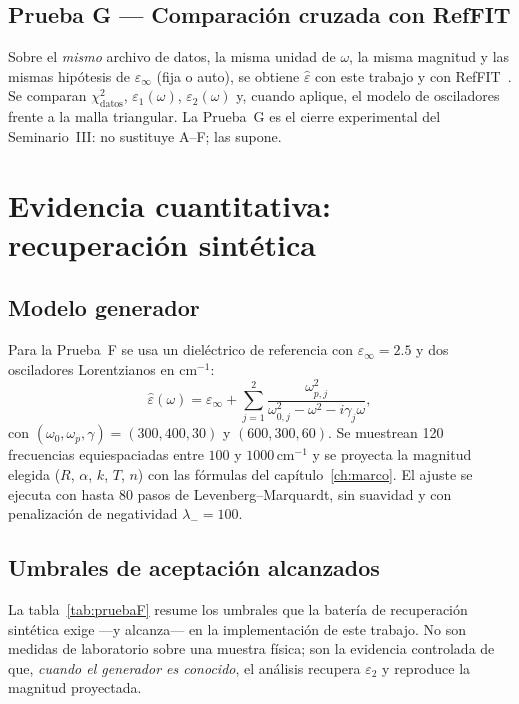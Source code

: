 \section{Prueba G --- Comparaci\'on cruzada con RefFIT}

Sobre el \emph{mismo} archivo de datos, la misma unidad de $\omega$, la misma magnitud y las mismas hip\'otesis de $\varepsilon_\infty$ (fija o auto), se obtiene $\hat\varepsilon$ con este trabajo y con RefFIT~\cite{guide}.
Se comparan $\chi^{2}_{\mathrm{datos}}$, $\varepsilon_1(\omega)$, $\varepsilon_2(\omega)$ y, cuando aplique, el modelo de osciladores frente a la malla triangular.
La Prueba~G es el cierre experimental del Seminario~III: no sustituye A--F; las supone.


\chapter{Evidencia cuantitativa: recuperaci\'on sint\'etica}
\label{ch:resultados}

\section{Modelo generador}

Para la Prueba~F se usa un diel\'ectrico de referencia con $\varepsilon_\infty=2.5$ y dos osciladores Lorentzianos en cm$^{-1}$:
\begin{equation}
\hat\varepsilon(\omega)=\varepsilon_\infty+\sum_{j=1}^{2}
\frac{\omega_{p,j}^{2}}{\omega_{0,j}^{2}-\omega^{2}-i\gamma_j\omega},
\end{equation}
con $(\omega_0,\omega_p,\gamma)=(300,400,30)$ y $(600,300,60)$.
Se muestrean 120 frecuencias equiespaciadas entre $100$ y $1000\,\mathrm{cm}^{-1}$ y se proyecta la magnitud elegida ($R$, $\alpha$, $k$, $T$, $n$) con las f\'ormulas del cap\'itulo~\ref{ch:marco}.
El ajuste se ejecuta con hasta 80 pasos de Levenberg--Marquardt, sin suavidad y con penalizaci\'on de negatividad $\lambda_-=100$.

\section{Umbrales de aceptaci\'on alcanzados}

La tabla~\ref{tab:pruebaF} resume los umbrales que la bater\'ia de recuperaci\'on sint\'etica exige ---y alcanza--- en la implementaci\'on de este trabajo.
No son medidas de laboratorio sobre una muestra f\'isica; son la evidencia controlada de que, \emph{cuando el generador es conocido}, el an\'alisis recupera $\varepsilon_2$ y reproduce la magnitud proyectada.

